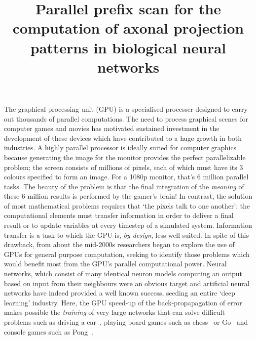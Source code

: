 \documentclass[12pt, a4paper]{article}
\title {Parallel prefix scan for the computation of axonal projection patterns in biological neural networks}
\date{} %
\author{\Authors}
\begin{document}
\setlength{\droptitle}{-1.5cm} %
\maketitle

\vspace{-0.8cm} %

The graphical processing unit (GPU) is a specialised processer designed to
carry out thousands of parallel computations. The need to process graphical
scenes for computer games and movies has motivated sustained investment in the
development of these devices which have contributed to a huge growth in both
industries. A highly parallel processor is ideally suited for computer
graphics because generating the image for the monitor provides the perfect
parallelizable problem; the screen consists of millions of pixels, each of
which must have its 3 colours specified to form an image. For a 1080p monitor,
that's 6 million parallel tasks. The beauty of the problem is that the final
integration of the
\emph{meaning} of these 6 million results is performed by the gamer's brain! In
contrast, the solution of most mathematical problems requires that `the pixels
talk to one another': the computational elements must transfer information in
order to deliver a final result or to update variables at every timestep of a
simulated system. Information transfer is a task to which the GPU is, \emph{by
design}, less well suited.
%
In spite of this drawback, from about the mid-2000s researchers began to
explore the use of GPUs for general purpose computation, seeking to identify
those problems which would benefit most from the GPU's parallel computational
power. Neural networks, which consist of many identical neuron models
computing an output based on input from their neighbours were an obvious
target and artificial neural networks have indeed provided a well known
success, seeding an entire `deep learning' industry. Here, the GPU speed-up of
the back-propapagation of error makes possible the \emph{training} of very
large networks that can solve difficult problems such as driving a
car~\cite{bojarski_end_2016,bojarski_explaining_2017}, playing board games
such as chess~\cite{thrun_learning_1995,david_deepchess_2016} or
Go~\cite{silver_general_2018} and console games such as
Pong~\cite{mnih_playing_2013}.
\end{document}
